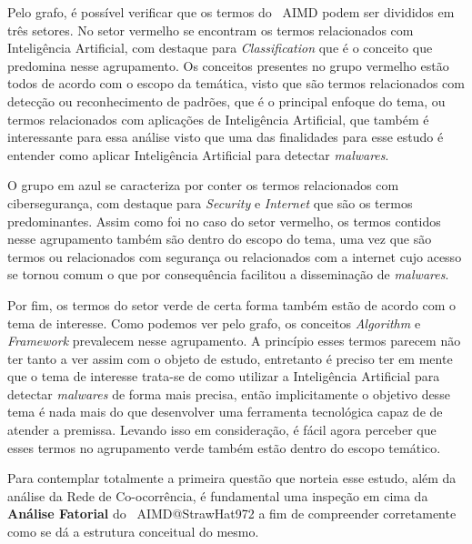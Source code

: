 Pelo grafo, é possível verificar que os termos do \dataset\ AIMD podem ser divididos em três setores. No setor vermelho se encontram os termos relacionados com Inteligência Artificial, com destaque para \textit{Classification} que é o conceito que predomina nesse agrupamento. Os conceitos presentes no grupo vermelho estão todos de acordo com o escopo da temática, visto que são termos relacionados com detecção ou reconhecimento de padrões, que é o principal enfoque do tema, ou termos relacionados com aplicações de Inteligência Artificial, que também é interessante para essa análise visto que uma das finalidades para esse estudo é entender como aplicar Inteligência Artificial para detectar \textit{malwares}.

O grupo em azul se caracteriza por conter os termos relacionados com cibersegurança, com destaque para \textit{Security} e \textit{Internet} que são os termos predominantes. Assim como foi no caso do setor vermelho, os termos contidos nesse agrupamento também são dentro do escopo do tema, uma vez que são termos ou relacionados com segurança ou relacionados com a internet cujo acesso se tornou comum o que por consequência facilitou a disseminação de \textit{malwares}.

Por fim, os termos do setor verde de certa forma também estão de acordo com o tema de interesse. Como podemos ver pelo grafo, os conceitos \textit{Algorithm} e \textit{Framework} prevalecem nesse agrupamento. A princípio esses termos parecem não ter tanto a ver assim com o objeto de estudo, entretanto é preciso ter em mente que o tema de interesse trata-se de como utilizar a Inteligência Artificial para detectar \textit{malwares} de forma mais precisa, então implicitamente o objetivo desse tema é nada mais do que desenvolver uma ferramenta tecnológica capaz de de atender a premissa. Levando isso em consideração, é fácil agora perceber que esses termos no agrupamento verde também estão dentro do escopo temático.

Para contemplar totalmente a primeira questão que norteia esse estudo, além da análise da Rede de Co-ocorrência, é fundamental uma inspeção em cima da \textbf{Análise Fatorial} do \dataset\ AIMD@StrawHat972 a fim de compreender corretamente como se dá a estrutura conceitual do mesmo.

